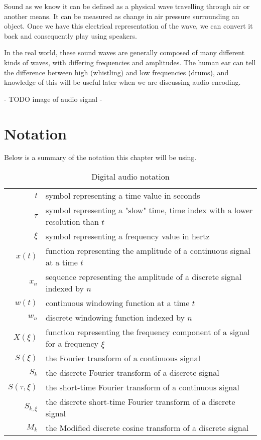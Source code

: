 Sound as we know it can be defined as a physical wave travelling through air or another means. \cite{you_2010} It can be measured as change in air pressure surrounding an object. Once we have this electrical representation of the wave, we can convert it back and consequently play using speakers.

In the real world, these sound waves are generally composed of many different kinds of waves, with differing frequencies and amplitudes. The human ear can tell the difference between high (whistling) and low frequencies (drums), and knowledge of this will be useful later when we are discussing audio encoding.

- TODO image of audio signal -

\section{Notation}
Below is a summary of the notation this chapter will be using.

\begin{table}[htbp]\caption{Digital audio notation}
\begin{tabular}{r l}
$t$ & symbol representing a time value in seconds \\
$\tau$ & symbol representing a "slow" time, time index with a lower resolution than $t$ \\
$\xi$ & symbol representing a frequency value in hertz \\
$x(t)$ & function representing the amplitude of a continuous signal at a time $t$ \\
$x_n$ & sequence representing the amplitude of a discrete signal indexed by $n$ \\
$w(t)$ & continuous windowing function at a time $t$ \\
$w_n$ & discrete windowing function indexed by $n$ \\
$X(\xi)$ & function representing the frequency component of a signal for a frequency $\xi$ \\
$S(\xi)$ & the Fourier transform of a continuous signal \\
$S_k$ & the discrete Fourier transform of a discrete signal \\
$S(\tau, \xi)$ & the short-time Fourier transform of a continuous signal \\
$S_{k, \xi}$ & the discrete short-time Fourier transform of a discrete signal \\
$M_k$ & the Modified discrete cosine transform of a discrete signal
\end{tabular}
\end{table}

